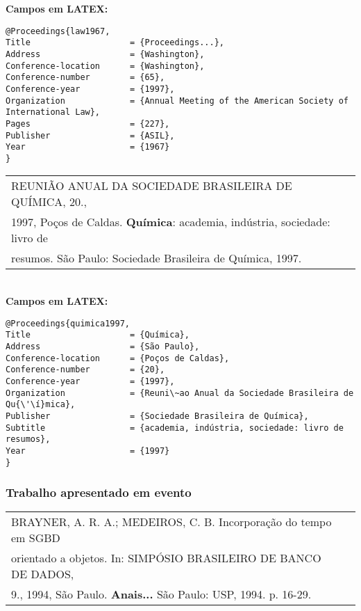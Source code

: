 \textbf{Campos em LATEX:} 
	
\begingroup
\fontsize{10pt}{12pt}\selectfont
\begin{verbatim}
@Proceedings{law1967,
Title                    = {Proceedings...},
Address                  = {Washington},
Conference-location      = {Washington},
Conference-number        = {65},
Conference-year          = {1997},
Organization             = {Annual Meeting of the American Society of 
International Law},
Pages                    = {227},
Publisher                = {ASIL},
Year                     = {1967}
}
\end{verbatim}
\endgroup
	
\begin{tabular}{|l|c|} \hline
	REUNIÃO ANUAL DA SOCIEDADE BRASILEIRA DE QUÍMICA, 20., \\1997, Poços de Caldas. \textbf{Química}: academia, indústria, sociedade: livro de \\resumos. São Paulo: Sociedade Brasileira de Química, 1997.  \\\hline
\end{tabular} \\
	
\textbf{Campos em LATEX:} 
	
\begingroup
\fontsize{10pt}{12pt}\selectfont
\begin{verbatim}
@Proceedings{quimica1997,
Title                    = {Química},
Address                  = {São Paulo},
Conference-location      = {Poços de Caldas},
Conference-number        = {20},
Conference-year          = {1997},
Organization             = {Reuni\~ao Anual da Sociedade Brasileira de 
Qu{\'\í}mica},
Publisher                = {Sociedade Brasileira de Química},
Subtitle                 = {academia, indústria, sociedade: livro de 
resumos},
Year                     = {1997}
}
\end{verbatim}
\endgroup
\subsubsection{Trabalho apresentado em evento}
	
\begin{tabular}{|l|c|} \hline
	BRAYNER, A. R. A.; MEDEIROS, C. B. Incorporação do tempo em SGBD \\orientado a objetos. In: SIMPÓSIO BRASILEIRO DE BANCO DE DADOS, \\9., 1994, São Paulo. \textbf{Anais...} São Paulo: USP, 1994. p. 16-29.  \\\hline
\end{tabular} \\
	
